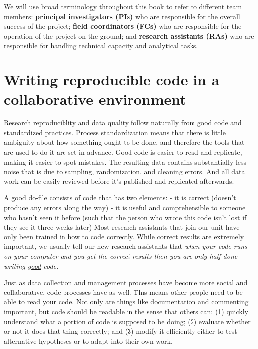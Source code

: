 We will use broad terminology throughout this book
to refer to different team members:
\textbf{principal investigators (PIs)} who are responsible for
the overall success of the project;
\textbf{field coordinators (FCs)} who are responsible for
the operation of the project on the ground;
and \textbf{research assistants (RAs)} who are responsible for
handling technical capacity and analytical tasks.

\section{Writing reproducible code in a collaborative environment}

Research reproduciblity and data quality follow naturally from
good code and standardized practices.
Process standardization means that there is
little ambiguity about how something ought to be done,
and therefore the tools that are used to do it are set in advance.
Good code is easier to read and replicate, making it easier to spot mistakes.
The resulting data contains substantially less noise
that is due to sampling, randomization, and cleaning errors. 
And all data work can be easily reviewed before it's published and replicated afterwards.

A good do-file consists of code that has two elements:
- it is correct (doesn't produce any errors along the way)
- it is useful and comprehensible to someone who hasn't seen it before (such that the person who wrote this code isn't lost if they see it three weeks later)
Most research assistants that join our unit have only been trained in how to code correctly.
While correct results are extremely important, we usually tell our new research assistants that
\textit{when your code runs on your computer and you get the correct results then you are only half-done writing \underline{good} code.}

Just as data collection and management processes have become more social and collaborative,
code processes have as well. This means other people need to be able to read your code.
Not only are things like documentation and commenting important,
but code should be readable in the sense that others can:
(1) quickly understand what a portion of code is supposed to be doing;
(2) evaluate whether or not it does that thing correctly; and
(3) modify it efficiently either to test alternative hypotheses
or to adapt into their own work.

